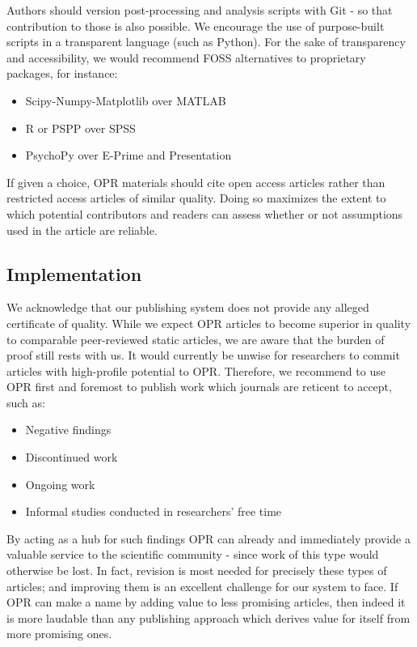 Authors should version post-processing and analysis scripts with Git - so that contribution to those is also possible.
We encourage the use of purpose-built scripts in a transparent language (such as Python).
For the sake of transparency and accessibility, we would recommend FOSS alternatives to proprietary packages, for instance:
\begin{itemize}
	\item Scipy-Numpy-Matplotlib\cite{numpy} over MATLAB
	\item R\cite{r} or PSPP\cite{pspp} over SPSS
	\item PsychoPy\cite{psychopy,Peirce2007} over E-Prime and Presentation
\end{itemize}
If given a choice, OPR materials should cite open access articles rather than restricted access articles of similar quality.
Doing so maximizes the extent to which potential contributors and readers can assess whether or not assumptions used in the article are reliable.
\subsection{Implementation}
We acknowledge that our publishing system does not provide any alleged certificate of quality.
While we expect OPR articles to become superior in quality to comparable peer-reviewed static articles, we are aware that the burden of proof still rests with us.
It would currently be unwise for researchers to commit articles with high-profile potential to OPR.
Therefore, we recommend to use OPR first and foremost to publish work which journals are reticent to accept, such as:
\begin{itemize}
	\item Negative findings
	\item Discontinued work
	\item Ongoing work
	\item Informal studies conducted in researchers' free time
\end{itemize}
By acting as a hub for such findings OPR can already and immediately provide a valuable service to the scientific community - since work of this type would otherwise be lost.
In fact, revision is most needed for precisely these types of articles;
and improving them is an excellent challenge for our system to face.
If OPR can make a name by adding value to less promising articles, then indeed it is more laudable than any publishing approach which derives value for itself from more promising ones.

